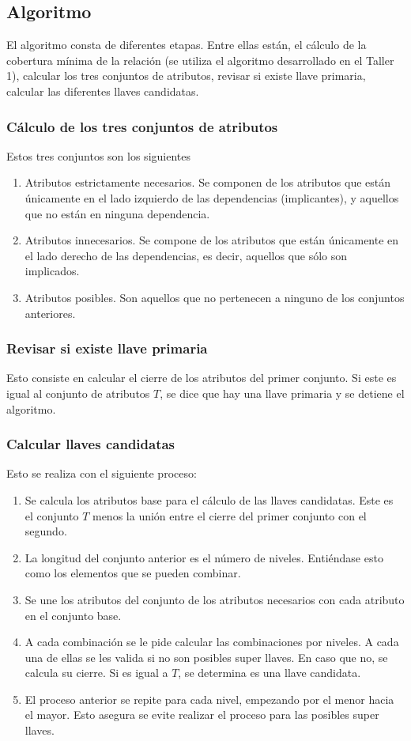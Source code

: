 \documentclass[a4paper,12pt]{article}
\begin{document}
{\subsection{Algoritmo}

El algoritmo consta de diferentes etapas. Entre ellas están, el cálculo de la cobertura mínima de la relación (se utiliza el algoritmo desarrollado en el Taller 1), calcular los tres conjuntos de atributos, revisar si existe llave primaria, calcular las diferentes llaves candidatas.

\subsubsection{Cálculo de los tres conjuntos de atributos}
Estos tres conjuntos son los siguientes
\begin{enumerate}
\item Atributos estrictamente necesarios. Se componen de los atributos que están únicamente en el lado izquierdo de las dependencias (implicantes), y aquellos que no están en ninguna dependencia.
\item Atributos innecesarios. Se compone de los atributos que están únicamente en el lado derecho de las dependencias, es decir, aquellos que sólo son implicados.
\item Atributos posibles. Son aquellos que no pertenecen a ninguno de los conjuntos anteriores.
\end{enumerate}

\subsubsection{Revisar si existe llave primaria}
Esto consiste en calcular el cierre de los atributos del primer conjunto. Si este es igual al conjunto de atributos $T$, se dice que hay una llave primaria y se detiene el algoritmo.

\subsubsection{Calcular llaves candidatas}
Esto se realiza con el siguiente proceso:
\begin{enumerate}
\item Se calcula los atributos base para el cálculo de las llaves candidatas. Este es el conjunto $T$ menos la unión entre el cierre del primer conjunto con el segundo.
\item La longitud del conjunto anterior es el número de niveles. Entiéndase esto como los elementos que se pueden combinar.
\item Se une los atributos del conjunto de los atributos necesarios con cada atributo en el conjunto base. 
\item A cada combinación se le pide calcular las combinaciones por niveles. A cada una de ellas se les valida si no son posibles super llaves. En caso que no, se calcula su cierre. Si es igual a $T$, se determina es una llave candidata.
\item El proceso anterior se repite para cada nivel, empezando por el menor hacia el mayor. Esto asegura se evite realizar el proceso para las posibles super llaves.


\end{enumerate}}
\end{document}
